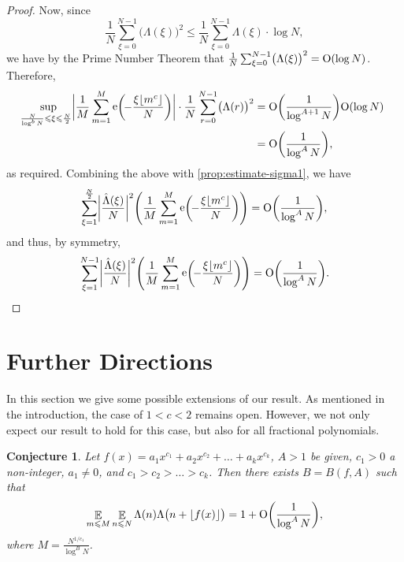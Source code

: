 \documentclass[letterpaper, 12pt]{article}
\theoremstyle{plain}
\newtheorem{Conjecture}[Theorem]{Conjecture}
\theoremstyle{definition}
\theoremstyle{plain}
\theoremstyle{plain}
\numberwithin{equation}{section}
\newcommand{\Oh}{{\rm O}}
\renewcommand{\leq}{\leqslant}
\newcommand{\E}{\mathbb{E}}
\newcommand{\1}{\textbf{1}}
\DeclarePairedDelimiter\floor{\lfloor}{\rfloor}
\DeclareMathOperator{\e}{e}
\begin{document}
\begin{proof}
    Now, since 
    \begin{equation*}
        \frac{1}{N} \sum_{\xi = 0}^{N - 1} \bigl(\Lambda(\xi)\bigr)^2 
        \leq \frac{1}{N} \sum_{\xi = 0}^{N - 1} \Lambda(\xi) \cdot \log N,
    \end{equation*}
    we have by the Prime Number Theorem that $\frac{1}{N} \sum_{\xi = 0}^{N - 1} \bigl(\Lambda(\xi) \bigr)^2 = \Oh(\log N)$. Therefore,
    \begin{align*}
        \sup_{\mkern-10mu \frac{N}{\log^b N} \leq \xi \leq \frac{N}{2}}
        \biggl\lvert \frac{1}{M} \sum_{m = 1}^{M} \e\biggl(\! -\frac{\xi \floor{m^c}}{N} \biggr)\biggr\rvert 
        \cdot \frac{1}{N}\sum_{r = 0}^{N - 1} \bigl(\Lambda(r)\bigr)^2 
        &= \Oh\biggl(\frac{1}{\log^{A + 1} N} \biggr) \Oh(\log N)\\
        &= \Oh\biggl(\frac{1}{\log^A N} \biggr),
    \end{align*}
    as required. Combining the above with \cref{prop:estimate-sigma1}, we have 
    \begin{equation*}
        \sum_{\xi = 1}^{\frac{N}{2}} \biggl\lvert \frac{\hat{\Lambda}(\xi)}{N} \biggr\rvert^2 \Biggl(\frac{1}{M} \sum_{m = 1}^M \e\biggl(\! -\frac{\xi \floor{m^c}}{N} \biggr)\Biggr)
        = \Oh \biggl(\frac{1}{\log^A N}\biggr),
    \end{equation*}
    and thus, by symmetry,
    \begin{equation*}
        \sum_{\xi = 1}^{N-1} \biggl\lvert \frac{\hat{\Lambda}(\xi)}{N} \biggr\rvert^2 \Biggl(\frac{1}{M} \sum_{m = 1}^M \e\biggl(\! -\frac{\xi \floor{m^c}}{N} \biggr)\Biggr) 
        = \Oh\biggl(\frac{1}{\log^A N}\biggr).
    \end{equation*}
\end{proof}

\section{Further Directions}
\hspace{20pt} In this section we give some possible extensions of our result. As mentioned in the introduction, the case of \(1 < c < 2\) remains open. However, we not only expect our result to hold for this case, but also for all fractional polynomials.
\begin{Conjecture}\label{conj:frac} 
    Let $f(x) = a_1 x^{c_1} + a_2 x^{c_2} + \ldots + a_k x^{c_k}$, $A > 1$ be given, $c_1 > 0$ a non-integer, $a_1 \neq 0$, and $c_1 > c_2 > \ldots > c_k$. Then there exists $B = B(f,A)$ such that 
    \[
        \mathop{\E}_{m \leq M} \mathop{\E}_{n \leq N} \Lambda(n) \Lambda\bigl(n + \floor{f(x)}\bigr) 
        = 1 + \Oh\biggl(\frac{1}{\log^A N} \biggr),
    \] 
    where $M = \frac{N^{1/c_1}}{\log^{B} N}$.
\end{Conjecture}
\end{document}
